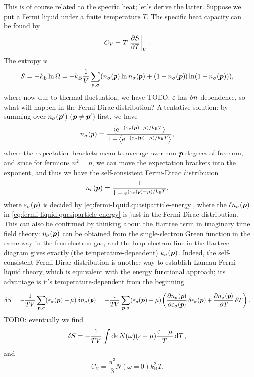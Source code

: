 \documentclass[hyperref, a4paper]{article}
\newcommand*{\ee}{\mathrm{e}}
\newcommand*{\kB}{k_{\text{B}}}
\begin{document}
This is of course related to the specific heat; 
let's derive the latter. 
Suppose we put a Fermi liquid under a finite temperature $T$.
The specific heat capacity can be found by 
\begin{equation}
    C_V = T \eval{\pdv{S}{T}}_V.
\end{equation}
The entropy is 
\begin{equation}
    S = - \kB \ln \Omega 
    = - \kB \frac{1}{V} \sum_{\vb*{p}, \sigma}
    (n_\sigma(\vb*{p}) \ln n_{\sigma}(\vb*{p})
    + (1 - n_\sigma(\vb*{p})) \ln (1 - n_{\sigma}(\vb*{p}))) ,
\end{equation} 
where now due to thermal fluctuation, 
we have TODO: $\varepsilon$ has $\var{n}$ dependence, 
so what will happen in the Fermi-Dirac distribution?
A tentative solution: 
by summing over $n_\sigma(\vb*{p}')$ ($\vb*{p} \neq \vb*{p}'$) first, 
we have 
\[
    n_\sigma(\vb*{p}) = \frac{
        \expval{\ee^{- (\varepsilon_\sigma(\vb*{p}) - \mu) / \kB T}}
    }{
        1 + \expval{\ee^{- (\varepsilon_\sigma(\vb*{p}) - \mu) / \kB T}}
    },
\]
where the expectation brackets mean 
to average over non-$\vb*{p}$ degrees of freedom, 
and since for fermions $n^2 = n$, 
we can move the expectation brackets into the exponent,
and thus we have the self-consistent Fermi-Dirac distribution
\begin{equation}
    n_\sigma(\vb*{p}) = \frac{1}{
        1 + \ee^{(\varepsilon_\sigma(\vb*{p}) - \mu) / \kB T}
    },
\end{equation}
where $\varepsilon_\sigma(\vb*{p})$ 
is decided by \eqref{eq:fermi-liquid.quasiparticle-energy}, 
where the $\var{n_\sigma(\vb*{p})}$ in \eqref{eq:fermi-liquid.quasiparticle-energy} 
is just in the Fermi-Dirac distribution.
This can also be confirmed by 
thinking about the Hartree term 
in imaginary time field theory:
$n_\sigma(\vb*{p})$ can be obtained from the single-electron Green function
in the same way in the free electron gas,
and the loop electron line in the Hartree diagram 
gives exactly (the temperature-dependent) $n_{\sigma}(\vb*{p})$.
Indeed, the self-consistent Fermi-Dirac distribution 
is another way to establish Landau Fermi liquid theory, 
which is equivalent with the energy functional approach;
its advantage is it's temperature-dependent from the beginning.

\begin{equation}
    \var{S} = - \frac{1}{TV} \sum_{\vb*{p}, \sigma}
    (\varepsilon_{\sigma}(\vb*{p}) - \mu)
    \var{n_\sigma(\vb*{p})}
    = - \frac{1}{TV} \sum_{\vb*{p}, \sigma}
    (\varepsilon_{\sigma}(\vb*{p}) - \mu)
    \left(
        \pdv{n_\sigma(\vb*{p})}{\varepsilon_\sigma(\vb*{p})} \var{\epsilon_\sigma(\vb*{p})}
        + \pdv{n_\sigma(\vb*{p})}{T} \var{T}
    \right).
\end{equation}
TODO: eventually we find 
\begin{equation}
    \var{S} = - \frac{1}{TV} \int \dd{\varepsilon} N(\omega) 
    (\varepsilon - \mu) \frac{\varepsilon - \mu}{T} \dd{T},
\end{equation}
and 
\begin{equation}
    C_V = \frac{\pi^3}{3} N(\omega = 0) \kB^2 T.
\end{equation}
\end{document}
